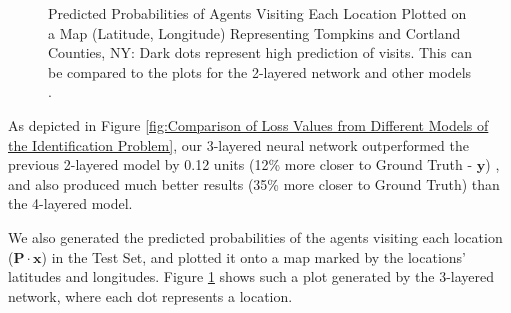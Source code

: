 \documentclass[12pt]{article}
\newcommand{\matr}[1]{\mathbf{#1}}  %
\begin{document}
\begin{figure}[!htbp]
\begin{minipage}{.49\textwidth}
            \caption[Predicted Probabilities of Agents Visiting Each Location Plotted on a Map (Latitude, Longitude) Representing Tompkins and Cortland Counties, NY]{Predicted Probabilities of Agents Visiting Each Location Plotted on a Map (Latitude, Longitude) Representing Tompkins and Cortland Counties, NY: Dark dots represent high prediction of visits. This can be compared to the plots for the 2-layered network and other models \cite[Figure 3]{Xue2016Avi2}.}
            \label{fig:Predicted Probabilities of Agents Visiting Each Location Plotted on a Map}
        \end{minipage}
    \end{figure}
    As depicted in Figure \ref{fig:Comparison of Loss Values from Different Models of the Identification Problem}, our 3-layered neural network outperformed the previous 2-layered model by 0.12 units (12\% more closer to Ground Truth - $\matr{y}$) \cite[Table 1]{Xue2016Avi2}, and also produced much better results (35\% more closer to Ground Truth) than the 4-layered model.
    
    We also generated the predicted probabilities of the agents visiting each location ($\matr{P} \cdot \matr{x}$) in the Test Set, and plotted it onto a map marked by the locations' latitudes and longitudes. Figure \ref{fig:Predicted Probabilities of Agents Visiting Each Location Plotted on a Map} shows such a plot generated by the 3-layered network, where each dot represents a location.
    
\end{document}
